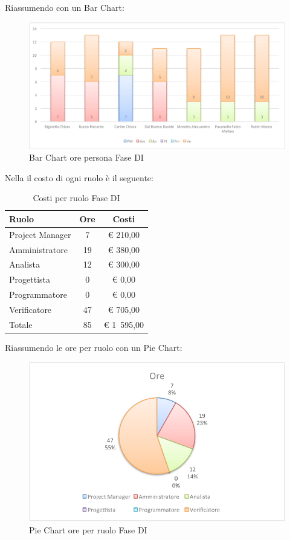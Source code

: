 				Riassumendo con un Bar Chart:
				\begin{figure}[H]\centering
					\includegraphics[width=\textwidth]{PianoDiProgetto/Pics/ChartOreFaseDI.pdf}
					\caption{Bar Chart ore persona Fase DI}
				\end{figure}
				Nella  il costo di ogni ruolo è il seguente:
				\begin{table}[H]
					\begin{center}
						\begin{tabular}{| l | c | c |}
							\hline
							Ruolo 				& Ore 	& Costi  \\ \hline
						
							Project Manager		& 7 	& \euro{} 210,00 	\\
							Amministratore 		& 19 	& \euro{} 380,00 	\\
							Analista	 		& 12 	& \euro{} 300,00 	\\
							Progettista 		& 0		& \euro{} 0,00 		\\
							Programmatore		& 0		& \euro{} 0,00		\\
							Verificatore		& 47 	& \euro{} 705,00 	\\ \hline \hline
							
							Totale	 			& 85 	& \euro{} 1~595,00 	\\ \hline
						\end{tabular}
					\end{center}
					\caption{Costi per ruolo Fase DI}
				\end{table}
				Riassumendo le ore per ruolo con un Pie Chart:
				\begin{figure}[H]\centering
					\includegraphics[width=\textwidth]{PianoDiProgetto/Pics/ChartTotOreFaseDI.pdf}
					\caption{Pie Chart ore per ruolo Fase DI}
				\end{figure}
